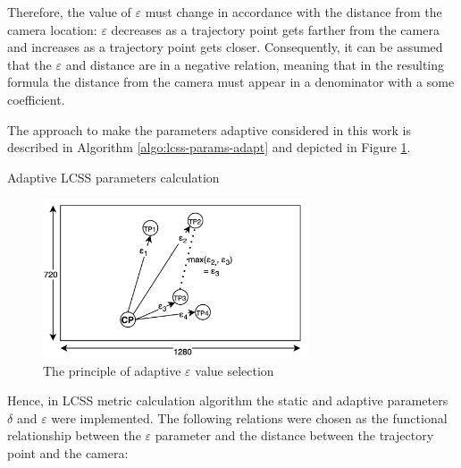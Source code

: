 Therefore, the value of $\varepsilon$ must change in accordance with the distance from the camera location: $\varepsilon$ decreases as a trajectory point gets farther from the camera and increases as a trajectory point gets closer. Consequently, it can be assumed that the $\varepsilon$ and distance are in a negative relation, meaning that in the resulting formula the distance from the camera must appear in a denominator with a some coefficient.

The approach to make the parameters adaptive considered in this work is described in Algorithm \ref{algo:lcss-params-adapt} and depicted in Figure \ref{fig:adaptivity}.

\begin{algorithm}[!htb]
	\caption{Adaptive LCSS parameters calculation}
	\label{algo:lcss-params-adapt}
	\SetAlgoLined
\end{algorithm}

\begin{figure}[!htb]
	\centering{}
	\includegraphics[width=0.7\textwidth]{images/adaptivity.png}
	\caption{The principle of adaptive $\varepsilon$ value selection}
	\label{fig:adaptivity}
\end{figure}

Hence, in LCSS metric calculation algorithm the static and adaptive parameters $\delta$ and $\varepsilon$ were implemented. The following relations were chosen as the functional relationship between the $\varepsilon$ parameter and the distance between the trajectory point and the camera:

